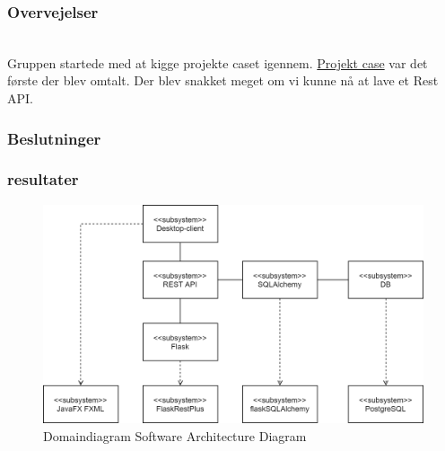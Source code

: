 \subsubsection{Overvejelser}
 \\
Gruppen startede med at kigge projekte caset igennem. \cite{TV2-case} \hyperlink{https://docs.google.com/document/d/1p6lQjWV76TX9uTLst2OAdmV07XfMRn5fObelzBpd2EI/edit}{Projekt case} var det første der blev omtalt. Der blev snakket meget om vi kunne nå at lave et Rest API.


\subsubsection{Beslutninger}


\subsubsection{resultater}

\begin{figure}[h]
    \centering
    \includegraphics[width=\textwidth]{figures/design/domaindiagram-Software Architecture Diagram.png}
    \caption{Domaindiagram Software Architecture Diagram}
    \label{fig:domaindiagram-software-diagram}
\end{figure}{}